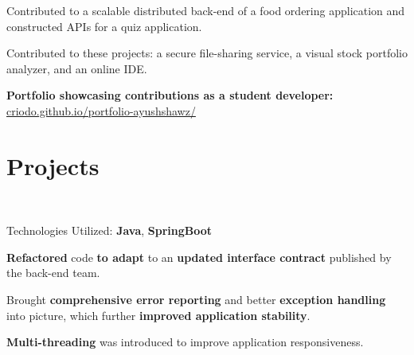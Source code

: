 \documentclass[]{deedy-resume-openfont}
\begin{document}
\begin{minipage}[t]{0.66\textwidth}
\begin{tightemize}
\item Contributed to a scalable distributed back-end of a food ordering application and constructed APIs for a quiz application.\\
\end{tightemize}

\begin{tightemize}
\item Contributed to these projects: a secure file-sharing service, a visual stock portfolio analyzer, and an online IDE.\\
\end{tightemize}

\setlength\parindent{24pt} \textbf{Portfolio showcasing contributions as a student developer:} \\ 
\href{https://criodo.github.io/portfolio-ayushshawz/}{criodo.github.io/portfolio-ayushshawz/}\\
\setlength\parindent{0pt}


\section{Projects}

\\
\begin{tightemize}
\item Technologies Utilized: \textbf{Java}, \textbf{SpringBoot}
\item \textbf{Refactored} code \textbf{to adapt} to an \textbf{updated interface contract} published by the back-end team.
\item Brought \textbf{comprehensive error reporting} and better \textbf{exception handling} into picture, which further \textbf{improved application stability}.
\item \textbf{Multi-threading} was introduced to improve application responsiveness.
\end{tightemize}
\sectionsep


\end{minipage}
\end{document}

